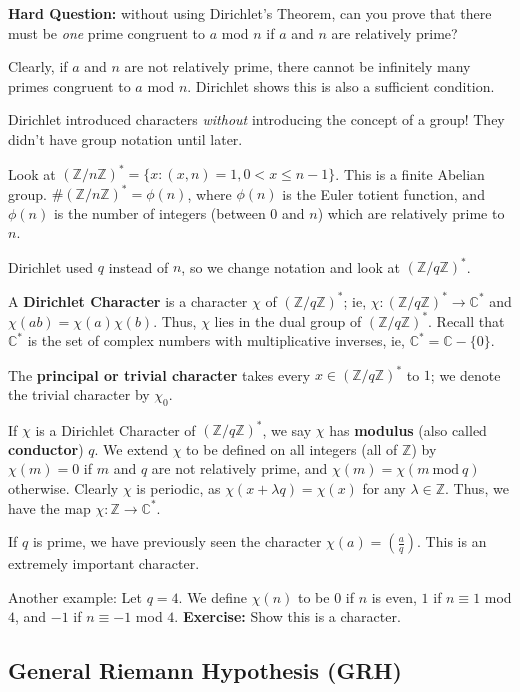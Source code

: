 \documentclass[12pt,letterpaper]{report}
\newcommand{\C}{\ensuremath{\mathbb{C}}}
\newcommand{\Z}{\ensuremath{\mathbb{Z}}}
\newcommand{\ZnZf}{ (\Z / n\Z)^{*}}
\newcommand{\ZqZf}{ (\Z / q\Z)^{*}}
\newcommand\lag[2]{\ensuremath{\left(\frac{#1}{#2}\right)}}
\begin{document}
\textbf{Hard Question:} without using Dirichlet's Theorem, can you
prove that there must be \emph{one} prime congruent to $a$ mod $n$
if $a$ and $n$ are relatively prime?

Clearly, if $a$ and $n$ are not relatively prime, there cannot be
infinitely many primes congruent to $a$ mod $n$. Dirichlet shows
this is also a sufficient condition.

Dirichlet introduced characters \emph{without} introducing the
concept of a group! They didn't have group notation until later.

Look at $\ZnZf = \{x: (x,n) = 1, 0 < x \le n-1\}$. This is a
finite Abelian group. $\# \ZnZf = \phi(n)$, where $\phi(n)$ is the
Euler totient function, and $\phi(n)$ is the number of integers
(between $0$ and $n$) which are relatively prime to $n$.

Dirichlet used $q$ instead of $n$, so we change notation and look
at $\ZqZf$.

A \textbf{Dirichlet Character} is a character $\chi$ of $\ZqZf$;
ie, $\chi: \ZqZf \rightarrow \C^{*}$ and $\chi(ab) =
\chi(a)\chi(b)$. Thus, $\chi$ lies in the dual group of $\ZqZf$.
Recall that $\C^{*}$ is the set of complex numbers with
multiplicative inverses, ie, $\C^{*} = \C - \{0\}$.

The \textbf{principal or trivial character} takes every $x \in
\ZqZf$ to $1$; we denote the trivial character by $\chi_0$.

If $\chi$ is a Dirichlet Character of $\ZqZf$, we say $\chi$ has
\textbf{modulus} (also called \textbf{conductor}) $q$. We extend
$\chi$ to be defined on all integers (all of $\Z$) by $\chi(m) =
0$ if $m$ and $q$ are not relatively prime, and $\chi(m) = \chi(m
\ \mbox{mod} \ q)$ otherwise. Clearly $\chi$ is periodic, as
$\chi(x + \lambda q) = \chi(x)$ for any $\lambda \in \Z$. Thus, we
have the map $\chi: \Z \rightarrow \C^{*}$.

If $q$ is prime, we have previously seen the character $\chi(a) =
\lag{a}{q}$. This is an extremely important character.

Another example: Let $q = 4$. We define $\chi(n)$ to be $0$ if $n$
is even, $1$ if $n \equiv 1$ mod $4$, and $-1$ if $n \equiv -1$
mod $4$. \textbf{Exercise:} Show this is a character.

\subsection{General Riemann Hypothesis (GRH)}
\end{document}

